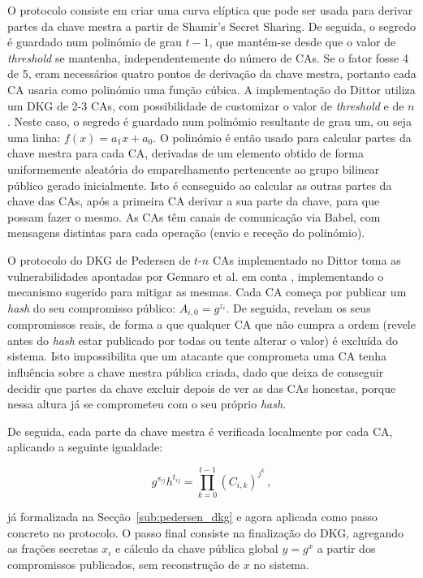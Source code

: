 O protocolo consiste em criar uma curva elíptica que pode ser usada para derivar partes da chave mestra a partir de Shamir's Secret Sharing. De seguida, o segredo é guardado num polinómio de grau $t-1$, que mantém-se desde que o valor de \textit{threshold} se mantenha, independentemente do número de CAs. Se o fator fosse 4 de 5, eram necessários quatro pontos de derivação da chave mestra, portanto cada CA usaria como polinómio uma função cúbica. A implementação do Dittor utiliza um DKG de 2-3 CAs, com possibilidade de customizar o valor de \textit{threshold} e de $n$. Neste caso, o segredo é guardado num polinómio resultante de grau um, ou seja uma linha: $f(x) = a_1x + a_0$. O polinómio é então usado para calcular partes da chave mestra para cada CA, derivadas de um elemento obtido de forma uniformemente aleatória do emparelhamento pertencente ao grupo bilinear público gerado inicialmente. Isto é conseguido ao calcular as outras partes da chave das CAs, após a primeira CA derivar a sua parte da chave, para que possam fazer o mesmo. As CAs têm canais de comunicação via Babel, com mensagens distintas para cada operação (envio e receção do polinómio).

O protocolo do DKG de Pedersen de $t$-$n$ CAs \cite{pedersen1991threshold} implementado no Dittor toma as vulnerabilidades apontadas por Gennaro et al. em conta \cite{gennaro2007secure}, implementando o mecanismo sugerido para mitigar as mesmas. Cada CA começa por publicar um \textit{hash} do seu compromisso público: $A_{i,0} = g^{z_i}$. De seguida, revelam os seus compromissos reais, de forma a que qualquer CA que não cumpra a ordem (revele antes do \textit{hash} estar publicado por todas ou tente alterar o valor) é excluída do sistema. Isto impossibilita que um atacante que comprometa uma CA tenha influência sobre a chave mestra pública criada, dado que deixa de conseguir decidir que partes da chave excluir depois de ver as das CAs honestas, porque nessa altura já se comprometeu com o seu próprio \textit{hash}.

De seguida, cada parte da chave mestra é verificada localmente por cada CA, aplicando a seguinte igualdade:

\begin{equation*}
    g^{s_{ij}} h^{t_{ij}} = \prod_{k=0}^{t-1} (C_{i,k})^{j^k} \, ,
\end{equation*}

já formalizada na Secção~\ref{sub:pedersen_dkg} e agora aplicada como passo concreto no protocolo. O passo final consiste na finalização do DKG, agregando as frações secretas $x_i$ e cálculo da chave pública global $y = g^x$ a partir dos compromissos publicados, sem reconstrução de $x$ no sistema.


